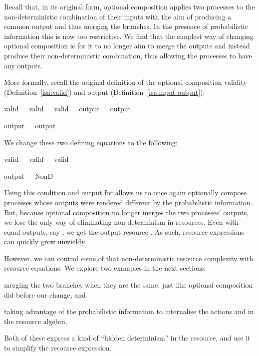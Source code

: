 \documentclass[class=smolathesis,crop=false]{standalone}
\begin{document}
Recall that, in its original form, optional composition applies two processes to the non-deterministic combination of their inputs with the aim of producing a common output and thus merging the branches.
In the presence of probabilistic information this is now too restrictive.
We find that the simplest way of changing optional composition is for it to no longer aim to merge the outputs and instead produce their non-deterministic combination, thus allowing the processes to have any outputs.

More formally, recall the original definition of the optional composition validity (Definition~\ref{isa:valid}) and output (Definition~\ref{isa:input-output}):
\begin{isabelle}
\centering
  valid\ \ \isasymequiv\ valid\ \ \isasymand\ valid\ \ \isasymand\ output\ \ \isacharequal\ output\ 
\item
  output\ \ \isacharequal\ output\ 
\end{isabelle}
We change these two defining equations to the following:
\begin{isabelle}
\centering
  valid\ \ \isasymequiv\ valid\ \ \isasymand\ valid\ 
\item
  output\ \ \isacharequal\ NonD\ \ \ 
\end{isabelle}

Using this condition and output for  allows us to once again optionally compose processes whose outputs were rendered different by the probabilistic information.
But, because optional composition no longer merges the two processes' outputs, we lose the only way of eliminating non-determinism in resources.
Even with equal outputs, say , we get the output resource .
As such, resource expressions can quickly grow unwieldy.

However, we can control some of that non-deterministic resource complexity with resource equations.
We explore two examples in the next sections:
\begin{enumerate*}[label=(\roman*)]
  \item merging the two branches when they are the same, just like optional composition did before our change, and
  \item taking advantage of the probabilistic information to internalise the actions  and  in the resource algebra.
\end{enumerate*}
Both of these express a kind of ``hidden determinism'' in the resource, and use it to simplify the resource expression.
\end{document}
